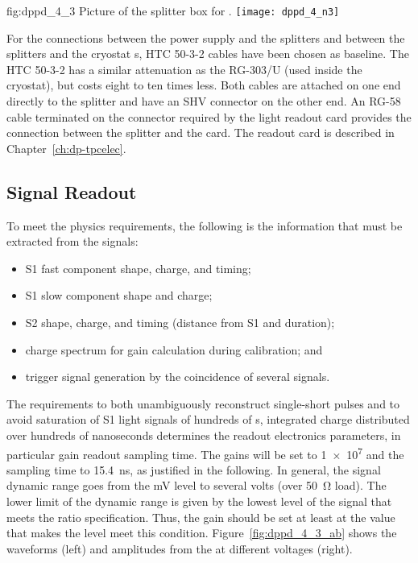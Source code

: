 \begin{dunefigure}{fig:dppd_4_3}
{Picture of the splitter box for .}
\texttt{[image: dppd\_4\_n3]}
\end{dunefigure}

For the connections between the  power supply and the splitters and between the splitters and the cryostat \fdth{}s, HTC 50-3-2 cables have been chosen as baseline. The HTC 50-3-2 has a similar attenuation as the RG-303/U (used inside the cryostat), but costs eight to ten times less. Both cables are attached on one end directly to the  splitter and have an SHV connector on the other end. An RG-58 cable terminated on the connector required by the light readout card provides the connection between the splitter and the card. The  readout card is described in Chapter~\ref{ch:dp-tpcelec}.


\subsection{Signal Readout}
\label{sec:fddp-pd-4.3}

To meet the physics requirements, the following is the information that must be extracted from the  signals:

\begin{itemize}
\item S1 fast component shape, charge, and timing;
\item S1 slow component shape and charge;
\item S2 shape, charge, and timing (distance from S1 and duration);
\item {} charge spectrum for gain calculation during  calibration; and
\item trigger signal generation by the coincidence of several  signals.
\end{itemize}


The requirements to both unambiguously reconstruct single-\phel short pulses and to avoid saturation of S1 light signals of hundreds of \phel{}s, integrated charge distributed over hundreds of nanoseconds determines the readout electronics parameters, in particular  gain readout sampling time. The  gains will be set to \num{1e7} and the sampling time to \SI{15.4}{ns}, as justified in the following. In general, the  signal dynamic range goes from the \si{mV} level to several volts (over \SI{50}{\ohm} load). The lower limit of the  dynamic range is given by the lowest level of the  signal that meets the  ratio specification. Thus, the  gain should be set at least at the value that makes the  level meet this condition. Figure~\ref{fig:dppd_4_3_ab} shows the  waveforms (left) and amplitudes from the  at different voltages (right).

